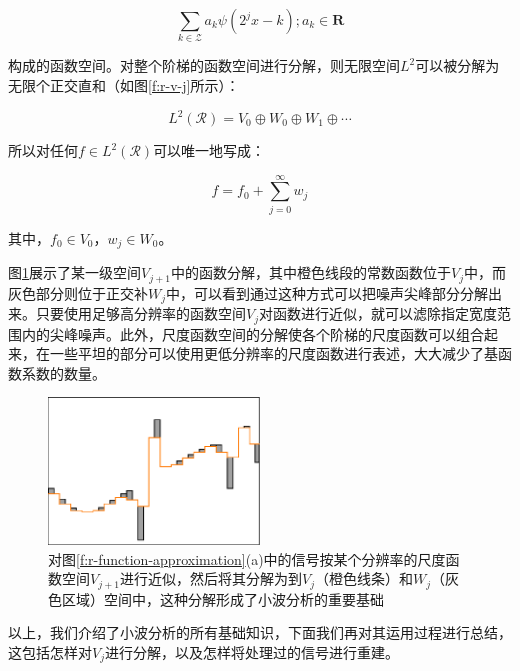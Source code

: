 \begin{equation}
	\sum_{k\in\mathcal{Z}}a_k\psi(2^{j}x-k);a_k\in\mathbf{R}
\end{equation}

\noindent 构成的函数空间。对整个阶梯的函数空间进行分解，则无限空间$L^{2}$可以被分解为无限个正交直和（如图\ref{f:r-v-j}所示）：

\begin{equation}\label{e:r-wavelet-decompose-1}
	L^{2}(\mathcal{R})=V_0\oplus W_0\oplus W_1\oplus\cdots
\end{equation}

\noindent 所以对任何$f\in L^{2}(\mathcal{R})$可以唯一地写成：

\begin{equation}\label{e:r-wavelet-decompose-2}
	f=f_0+\sum^{\infty}_{j=0}w_j
\end{equation}

\noindent 其中，$f_0\in V_0$，$w_j\in W_0$。

图\ref{f:r-decompose}展示了某一级空间$V_{j+1}$中的函数分解，其中橙色线段的常数函数位于$V_j$中，而灰色部分则位于正交补$W_j$中，可以看到通过这种方式可以把噪声尖峰部分分解出来。只要使用足够高分辨率的函数空间$V_j$对函数进行近似，就可以滤除指定宽度范围内的尖峰噪声。此外，尺度函数空间的分解使各个阶梯的尺度函数可以组合起来，在一些平坦的部分可以使用更低分辨率的尺度函数进行表述，大大减少了基函数系数的数量。

\begin{figure}
	\sidecaption
	\includegraphics[width=0.5\textwidth]{figures/r/decompose}
	\caption{对图\ref{f:r-function-approximation}(a)中的信号按某个分辨率的尺度函数空间$V_{j+1}$进行近似，然后将其分解为到$V_j$（橙色线条）和$W_j$（灰色区域）空间中，这种分解形成了小波分析的重要基础}
	\label{f:r-decompose}
\end{figure}

以上，我们介绍了小波分析的所有基础知识，下面我们再对其运用过程进行总结，这包括怎样对$V_j$进行分解，以及怎样将处理过的信号进行重建。





